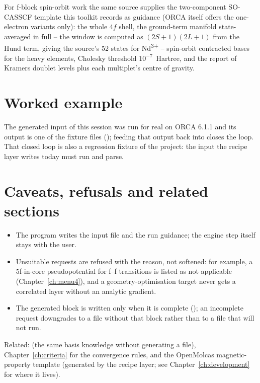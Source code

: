 For f-block spin-orbit work the same source supplies the two-component
SO-CASSCF template this toolkit records as guidance (ORCA itself offers the
one-electron variants only): the whole $4f$ shell, the ground-term manifold
state-averaged in full -- the window is computed as $(2S+1)(2L+1)$ from the
Hund term, giving the source's 52 states for Nd\textsuperscript{3+} -- spin-orbit
contracted bases for the heavy elements, Cholesky threshold $10^{-7}$~Hartree,
and the report of Kramers doublet levels plus each multiplet's centre of
gravity.

\section{Worked example}

The generated input of this session was run for real on ORCA 6.1.1 and its
output is one of the fixture files (); feeding
that output back into  closes the loop. That closed loop is also a
regression fixture of the project: the input the recipe layer writes today must
run and parse.

\section{Caveats, refusals and related sections}

\begin{refusalbox}
\begin{itemize}
  \item The program writes the input file and the run guidance; the engine step
    itself stays with the user.
  \item Unsuitable requests are refused with the reason, not softened: for
    example, a 5f-in-core pseudopotential for f--f transitions is listed as
    not applicable (Chapter~\ref{ch:menu4}), and a geometry-optimisation
    target never gets a correlated layer without an analytic gradient.
  \item The generated  block is written only when it is
    complete (); an incomplete request downgrades to
    a file without that block rather than to a file that will not run.
\end{itemize}
\end{refusalbox}

Related:  (the same basis knowledge without generating a file),
Chapter~\ref{ch:criteria} for the convergence rules, and the OpenMolcas
magnetic-property template (generated by the recipe layer; see
Chapter~\ref{ch:development} for where it lives).

